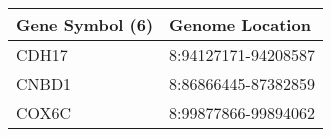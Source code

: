 \begin{tabular}{ll}
\toprule
Gene Symbol (6) &     Genome Location \\
\midrule
          CDH17 & 8:94127171-94208587 \\
          CNBD1 & 8:86866445-87382859 \\
          COX6C & 8:99877866-99894062 \\
\bottomrule
\end{tabular}
